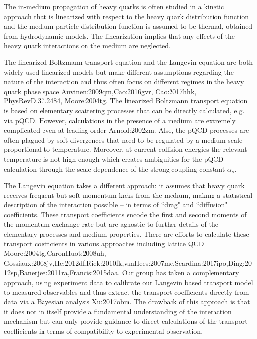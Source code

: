 The in-medium propagation of heavy quarks is often studied in a kinetic approach that is linearized with respect to the heavy quark distribution function and the medium particle distribution function is assumed to be thermal, obtained from hydrodynamic models.
The linearization implies that any effects of the heavy quark interactions on the medium are neglected.

The linearized Boltzmann transport equation and the Langevin equation are both widely used linearized models but make different assumptions regarding the nature of the interaction and thus often focus on different regimes in the heavy quark phase space {Auvinen:2009qm,Cao:2016gvr, Cao:2017hhk, PhysRevD.37.2484, Moore:2004tg}.
The linearized Boltzmann transport equation is based on elementary scattering processes that can be directly calculated, e.g. via pQCD.
However, calculations in the presence of a medium are extremely complicated even at leading order {Arnold:2002zm}.
Also, the pQCD processes are often plagued by soft divergences that need to be regulated by a medium scale proportional to temperature. Moreover, at current collision energies the relevant temperature is not high enough which creates ambiguities for the pQCD calculation through the scale dependence of the strong coupling constant $\alpha_s$.

The Langevin equation takes a different approach: 
it assumes that heavy quark receives frequent but soft momentum kicks from the medium, making a statistical description of the interaction possible -- in terms of ``drag" and ``diffusion" coefficients.
These transport coefficients encode the first and second moments of the momentum-exchange rate but are agnostic to further details of the elementary processes and medium properties.
There are efforts to calculate these transport coefficients in various approaches including lattice QCD {Moore:2004tg,CaronHuot:2008uh, Gossiaux:2008jv,He:2012df,Riek:2010fk,vanHees:2007me,Scardina:2017ipo,Ding:2012sp,Banerjee:2011ra,Francis:2015daa}. Our group has taken a complementary approach, using experiment data to calibrate our Langevin based transport model to measured observables and thus extract the transport coefficients directly from data via a Bayesian analysis {Xu:2017obm}. The drawback of this approach is that it does not in itself provide a fundamental understanding of the interaction mechanism but can only provide guidance to direct calculations of the transport coefficients in terms of compatibility to experimental observation.


